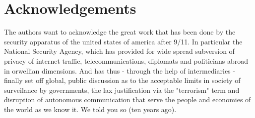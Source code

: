 \section{Acknowledgements}
The authors want to acknowledge the great work that has been done by the security apparatus of the united states of america after 9/11. In particular the National Security Agency, which has provided for wide spread subversion of privacy of internet traffic, telecommunications, diplomats and politicians abroad in orwellian dimensions. And has thus - through the help of intermediaries - finally set off global, public discussion as to the acceptable limits in society of surveilance by governments, the lax justification via the "terrorism" term and disruption of autonomous communication that serve the people and economies of the world as we know it. We told you so (ten years ago).

